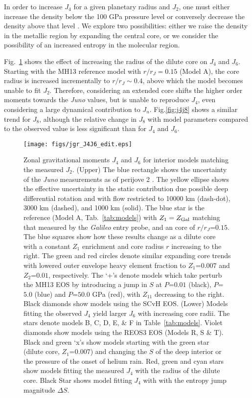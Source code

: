 In order to increase $J_4$ for a given planetary radius and $J_2$,  
one must either increase the density below the 100 GPa pressure level or
conversely decrease the density above that level \citep[][their
Fig.~5]{Guillot1999a}. We explore two possibilities: either we raise the density
in the metallic region by expanding the central core, or we consider the
possibility of an increased entropy in the molecular region.

Fig.~\ref{fig:j4j6} shows the effect of increasing the radius of the dilute
core on $J_4$ and $J_6$. Starting with the MH13 reference model with
$r/r_J=0.15$ (Model A), the core radius is increased incrementally to
$r/r_J\sim0.4$, above which the model becomes unable to fit $J_2$.  Therefore,
considering an extended core shifts the higher order moments towards the
\textit{Juno} values, but is unable to reproduce $J_4$, even considering a
large dynamical contribution to $J_n$.  Fig.\ref{fig:j4j8} shows a similar
trend for $J_8$, although the relative change in $J_8$ with model parameters
compared to the observed value is less significant than for $J_4$ and $J_6$. 


\begin{figure}[hp]
\centering

\texttt{[image: figs/jgr\_J4J6\_edit.eps]}

\caption{Zonal gravitational moments $J_4$ and $J_6$ for interior models
    matching the measured $J_2$.
    (Upper) The blue rectangle shows the uncertainty of the \textit{Juno}
    measurements as of perijove 2 \citep{Folkner2017}. The yellow ellipse shows
    the effective uncertainty in the static contribution due possible deep
    differential rotation \citep{Kaspi2017} and with flow restricted to 10000
    km (dash-dot), 3000 km (dashed), and 1000 km (solid). The blue star is the
    reference (Model A, Tab.~\ref{tab:models}) with $Z_1=Z_{\rm Gal}$ 
    matching that measured by the \textit{Galileo} entry probe, and an core of
    $r/r_J$=$0.15$. The blue squares show how these results change as a dilute
    core with a constant $Z_1$ enrichment and core radius $r$ increasing
    to the right. The green and red circles denote similar expanding core
    trends with lowered outer envelope heavy element fraction to 
    $Z_1$=$0.007$ and $Z_2$=$0.01$, respectively.  The `+'s denote models
    which take perturb the MH13 EOS by introducing a jump in $S$ at $P$=$0.01$
    (black), $P$=$5.0$ (blue) and $P$=$50.0$ GPa (red), with $Z_11$
    decreasing to the right. Black diamonds show models using the SCvH EOS.     
    (Lower) Models fitting the observed $J_4$ yield larger $J_6$ with increasing core
    radii. The stars denote models B, C, D, E, \& F in Table~\ref{tab:models}.
    Violet diamonds show models using the REOS3 EOS (Models R, S \& T).  Black
    and green `x's show models starting with the green star (dilute core,
    $Z_1$=$0.007$) and changing the $S$ of the deep interior or  the
    pressure of the onset of helium rain. Red, green and cyan stars show
    models fitting the measured $J_4$ with the radius of the dilute core.
    Black Star shows model fitting $J_4$ with with the entropy jump magnitude
    $\Delta S$. 
}
\label{fig:j4j6}
\end{figure}

